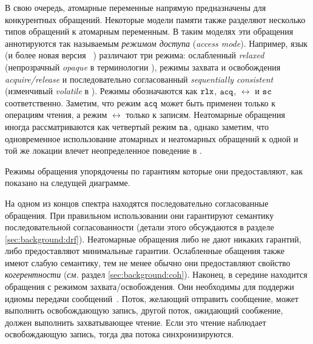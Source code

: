 В свою очередь, атомарные переменные напрямую 
предназначены для конкурентных обращений. 
Некоторые модели памяти также разделяют 
несколько типов обращений к атомарным переменным.
В таким моделях эти обращения аннотируются 
так называемым \emph{режимом доступа} (\emph{access mode}).
Например, язык \CPP (и более новая версия \Java~\cite{Bender-Palsberg:OOPSLA19})
различают три режима: ослабленный \emph{relaxed}
(непрозрачный \emph{opaque} в терминологии \Java),
режимы захвата и освобождения \emph{acquire/release} 
и последовательно согласованный \emph{sequentially consistent}
(изменчивый \emph{volatile} в \Java). 
Режимы обозначаются как $\mathtt{rlx}$, ${\mathtt{acq}}$, $\rel$ и ${\mathtt{sc}}$ соответственно.
Заметим, что режим ${\mathtt{acq}}$ может быть применен только к операциям чтения,
а режим $\rel$ только к записям.
Неатомарные обращения иногда рассматриваются как четвертый режим $\mathtt{na}$, 
однако заметим, что одновременное использование атомарных 
и неатомарных обращений к одной и той же локации 
влечет неопределенное поведение в \CPP.

Режимы обращения упорядочены по гарантиям 
которые они предоставляют, как показано на следущей диаграмме. 




На одном из концов спектра находятся последовательно согласованные обращения.
При правильном использовании они гарантируют семантику 
последовательной согласованности
(детали этого обсуждаются в разделе \cref{sec:background:drf}).
Неатомарные обращения либо не дают никаких гарантий, 
либо предоставляют минимальные гарантии. 
Ослабленные обащения также имеют слабую семантику, 
тем не менее обычно они предоставляют свойство \emph{когерентности}
(\emph{см.} раздел \cref{sec:background:coh}).
Наконец, в середине находится обращения с режимом захвата/освобождения. 
Они необходимы для поддержи идиомы передачи сообщений~\cite{Lahav-al:POPL16}.
Поток, желающий отправить сообщение, может выполнить освобождающую запись, 
другой поток, ожидающий сообжение, должен выполнить захватывающее чтение. 
Если это чтение наблюдает освобождающую запись, 
тогда два потока синхронизируются.

